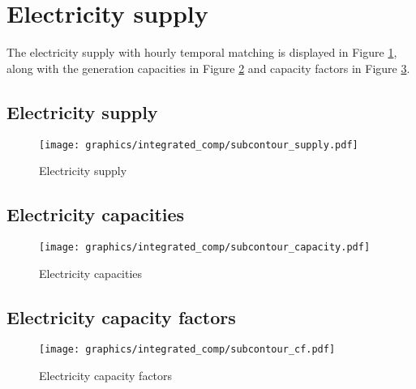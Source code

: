 
\clearpage

\section{Electricity supply}

The electricity supply with hourly temporal matching is displayed in Figure \ref{fig:supply}, along with the generation capacities
in Figure \ref{fig:el-cap} and capacity factors in Figure  \ref{fig:el-cf}.

\subsection{Electricity supply}
\label{subsec:el-supply}

\begin{figure}[h]
    \centering
    \texttt{[image: graphics/integrated\_comp/subcontour\_supply.pdf]}
    \caption{Electricity supply}
    \label{fig:supply}
\end{figure}

\subsection{Electricity capacities}
\label{subsec:el-cap}

\begin{figure}[h]
    \centering
    \texttt{[image: graphics/integrated\_comp/subcontour\_capacity.pdf]}
    \caption{Electricity capacities}
    \label{fig:el-cap}
\end{figure}

\subsection{Electricity capacity factors}
\label{subsec:el-cf}

\begin{figure}[h]
    \centering
    \texttt{[image: graphics/integrated\_comp/subcontour\_cf.pdf]}
    \caption{Electricity capacity factors}
    \label{fig:el-cf}
\end{figure}



